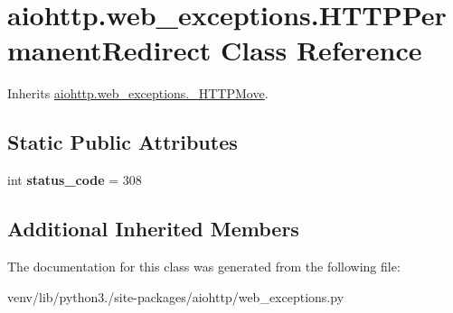 \hypertarget{classaiohttp_1_1web__exceptions_1_1_h_t_t_p_permanent_redirect}{}\section{aiohttp.\+web\+\_\+exceptions.\+H\+T\+T\+P\+Permanent\+Redirect Class Reference}
\label{classaiohttp_1_1web__exceptions_1_1_h_t_t_p_permanent_redirect}


Inherits \hyperlink{classaiohttp_1_1web__exceptions_1_1___h_t_t_p_move}{aiohttp.\+web\+\_\+exceptions.\+\_\+\+H\+T\+T\+P\+Move}.

\subsection*{Static Public Attributes}
\begin{DoxyCompactItemize}
\item 
\mbox{\label{classaiohttp_1_1web__exceptions_1_1_h_t_t_p_permanent_redirect_a3bfa65bb9c5940a0b46b3b6465d4795e}} 
int {\bfseries status\+\_\+code} = 308
\end{DoxyCompactItemize}
\subsection*{Additional Inherited Members}


The documentation for this class was generated from the following file\+:\begin{DoxyCompactItemize}
\item 
venv/lib/python3./site-\/packages/aiohttp/web\+\_\+exceptions.\+py\end{DoxyCompactItemize}
